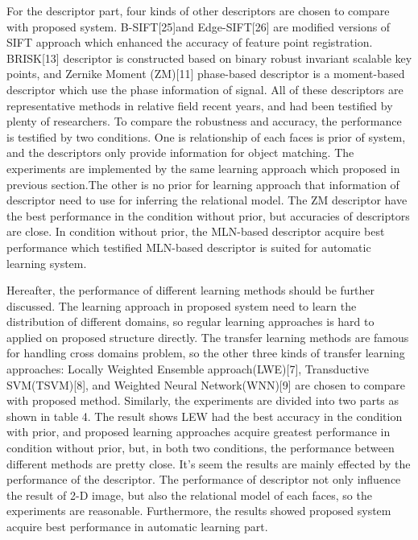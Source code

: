 \documentclass[journal]{IEEEtran}
\begin{document}
For the descriptor part, four kinds of other descriptors are chosen to compare with proposed system. B-SIFT[25]and Edge-SIFT[26] are modified versions of SIFT approach which enhanced the accuracy of feature point registration. BRISK[13] descriptor is constructed based on binary robust invariant scalable key points, and Zernike Moment (ZM)[11] phase-based descriptor is a moment-based descriptor which use the phase information of signal. All of these descriptors are representative methods in relative field recent years, and had been testified by plenty of researchers. To compare the robustness and accuracy, the performance is testified by two conditions. One is relationship of each faces is prior of system, and the descriptors only provide information for object matching. The experiments are implemented by the same learning approach which proposed in previous section.The other is no prior for learning approach that information of descriptor need to use for inferring the relational model. The ZM descriptor have the best performance in the condition without prior, but accuracies of descriptors are close. In condition without prior, the MLN-based descriptor acquire best performance which testified MLN-based descriptor is suited for automatic learning system. 

Hereafter, the performance of different learning methods should be further discussed. The learning approach in proposed system need to learn the distribution of different domains, so regular learning approaches is hard to applied on proposed structure directly. The transfer learning methods are famous for handling cross domains problem, so the other three kinds of transfer learning approaches: Locally Weighted Ensemble approach(LWE)[7], Transductive SVM(TSVM)[8], and Weighted Neural Network(WNN)[9] are chosen to compare with proposed method. Similarly, the experiments are divided into two parts as shown in table 4. The result shows LEW had the best accuracy in the condition with prior, and proposed learning approaches acquire greatest performance in condition without prior, but, in both two conditions, the performance between different methods are pretty close. It's seem the results are mainly effected by the performance of the descriptor. The performance of descriptor not only influence the result of 2-D image, but also the relational model of each faces, so the experiments are reasonable. Furthermore, the results showed proposed system acquire best performance in automatic learning part.  

\newcommand{\tabincell}[2]{\begin{tabular}{@{}#1@{}}#2\end{tabular}}
\end{document}

